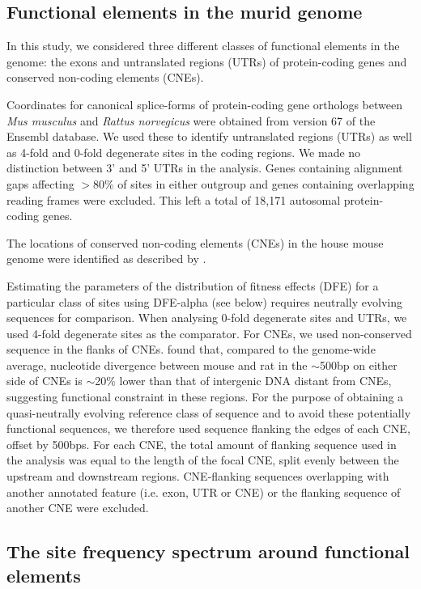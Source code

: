 \subsection{Functional elements in the murid genome}
        
	In this study, we considered three different classes of functional elements in the genome: the exons and untranslated regions (UTRs) of protein-coding genes and conserved non-coding elements (CNEs).

	Coordinates for canonical splice-forms of protein-coding gene orthologs between \textit{Mus musculus} and \textit{Rattus norvegicus} were obtained from version 67 of the Ensembl database. We used these to identify untranslated regions (UTRs) as well as 4-fold and 0-fold degenerate sites in the coding regions. We made no distinction between 3' and 5' UTRs in the analysis. Genes containing alignment gaps affecting $>$80\% of sites in either outgroup and genes containing overlapping reading frames were excluded. This left a total of 18,171 autosomal protein-coding genes.
 
	The locations of conserved non-coding elements (CNEs) in the house mouse genome were identified as described by \cite{RN122}. 

	Estimating the parameters of the distribution of fitness effects (DFE) for a particular class of sites using DFE-alpha (see below) requires neutrally evolving sequences for comparison. When analysing 0-fold degenerate sites and UTRs, we used 4-fold degenerate sites as the comparator. For CNEs, we used non-conserved sequence in the flanks of CNEs. \cite{RN122} found that, compared to the genome-wide average, nucleotide divergence between mouse and rat in the $\sim$500bp on either side of CNEs is $\sim$20\% lower than that of intergenic DNA distant from CNEs, suggesting functional constraint in these regions. For the purpose of obtaining a quasi-neutrally evolving reference class of sequence and to avoid these potentially functional sequences, we therefore used sequence flanking the edges of each CNE, offset by 500bps. For each CNE, the total amount of flanking sequence used in the analysis was equal to the length of the focal CNE, split evenly between the upstream and downstream regions. CNE-flanking sequences overlapping with another annotated feature (i.e. exon, UTR or CNE) or the flanking sequence of another CNE were excluded.

\subsection{The site frequency spectrum around functional elements}
 
